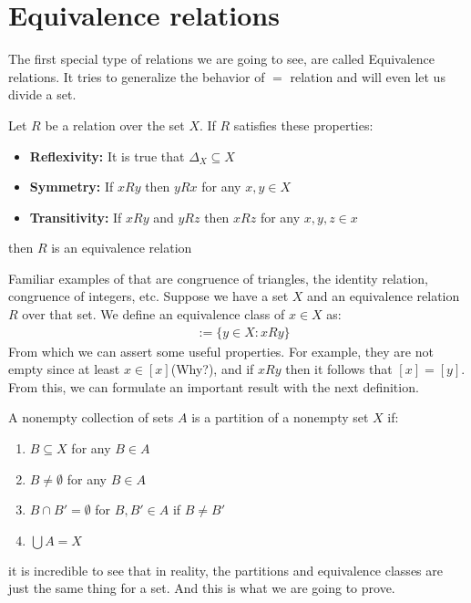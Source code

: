 \documentclass{tufte-handout}
\begin{document}
\section{Equivalence relations}
The first special type of relations we are going to see, are called Equivalence relations. It tries to generalize the behavior of $=$ relation and will even let us divide a set.
\begin{definition}
	Let $R$ be a relation over the set $X$. If $R$ satisfies these properties:
	\begin{itemize}
		\item \textbf{Reflexivity:} It is true that $\Delta_X \subseteq X$
		\item \textbf{Symmetry:} If $xRy$ then $yRx$ for any $x, y \in X$
		\item \textbf{Transitivity:} If $xRy$ and $yRz$ then $xRz$ for any $x, y, z \in x$
	\end{itemize}
	then $R$ is an equivalence relation
\end{definition}

Familiar examples of that are congruence of triangles, the identity relation, congruence of integers, etc. Suppose we have a set $X$ and an equivalence relation $R$ over that set. We define an equivalence class of $x \in X$ as:
\begin{align*}
	[x] &:= \{y \in X: xRy\}
\end{align*} 
From which we can assert some useful properties. For example, they are not empty since at least $x \in [x]$(Why?), and if $xRy$ then it follows that $[x] = [y]$. From this, we can formulate an important result with the next definition.

\begin{definition}
	A nonempty collection of sets $A$ is a partition of a nonempty set $X$ if:
	\begin{enumerate}
		\item $B \subseteq X$ for any $B \in A$
		\item $B \neq \emptyset$ for any $B \in A$
		\item $B \cap B' = \emptyset$ for $B, B' \in A$ if $B \neq B'$
		\item $\bigcup A = X$
	\end{enumerate}
\end{definition}

it is incredible to see that in reality, the partitions and equivalence classes are just the same thing for a set. And this is what we are going to prove.
\end{document}
